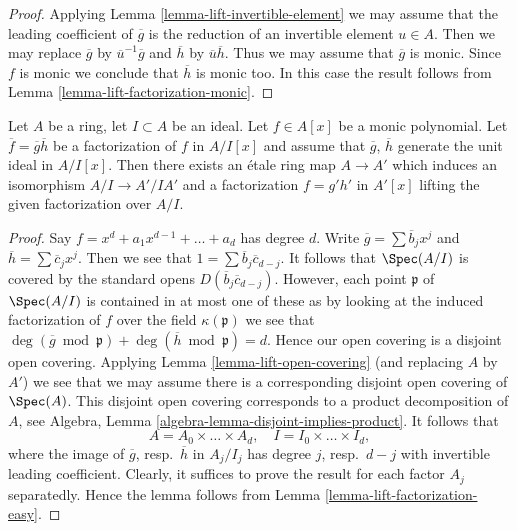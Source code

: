 \begin{proof}
Applying Lemma \ref{lemma-lift-invertible-element} we may assume that
the leading coefficient of $\overline{g}$ is the reduction of an
invertible element $u \in A$. Then we may replace $\overline{g}$ by
$\overline{u}^{-1}\overline{g}$ and $\overline{h}$ by
$\overline{u}\overline{h}$. Thus we may assume that $\overline{g}$
is monic. Since $f$ is monic we conclude that $\overline{h}$ is monic
too. In this case the result follows from
Lemma \ref{lemma-lift-factorization-monic}.
\end{proof}

\begin{lemma}
\label{lemma-lift-factorization}
Let $A$ be a ring, let $I \subset A$ be an ideal.
Let $f \in A[x]$ be a monic polynomial.
Let $\overline{f} = \overline{g} \overline{h}$ be a factorization of $f$
in $A/I[x]$ and assume that  $\overline{g}$, $\overline{h}$ generate
the unit ideal in $A/I[x]$. Then there exists an \'etale ring map
$A \to A'$ which induces an isomorphism $A/I \to A'/IA'$ and a factorization
$f = g' h'$ in $A'[x]$ lifting the given factorization over $A/I$.
\end{lemma}

\begin{proof}
Say $f = x^d + a_1 x^{d - 1} + \ldots + a_d$ has degree $d$.
Write $\overline{g} = \sum \overline{b}_j x^j$ and
$\overline{h} = \sum \overline{c}_j x^j$. Then we see that
$1 = \sum \overline{b}_j \overline{c}_{d - j}$. It follows that
$\Spec(A/I)$ is covered by the standard opens
$D(\overline{b}_j \overline{c}_{d - j})$. However, each point
$\mathfrak p$ of $\Spec(A/I)$ is contained in at most one of these as
by looking at the induced factorization of $f$ over the field
$\kappa(\mathfrak p)$ we see that $\deg(\overline{g} \bmod \mathfrak p) +
\deg(\overline{h} \bmod \mathfrak p) = d$. Hence our open covering
is a disjoint open covering. Applying Lemma \ref{lemma-lift-open-covering}
(and replacing $A$ by $A'$) we see that we may assume there is a
corresponding disjoint open covering of $\Spec(A)$. This disjoint open
covering corresponds to a product decomposition of $A$, see
Algebra, Lemma \ref{algebra-lemma-disjoint-implies-product}. It follows that
$$
A = A_0 \times \ldots \times A_d,
\quad
I = I_0 \times \ldots \times I_d,
$$
where the image of $\overline{g}$, resp.\ $\overline{h}$ in $A_j/I_j$
has degree $j$, resp.\ $d - j$ with invertible leading coefficient.
Clearly, it suffices to prove the result for each factor $A_j$
separatedly. Hence the lemma follows from
Lemma \ref{lemma-lift-factorization-easy}.
\end{proof}


